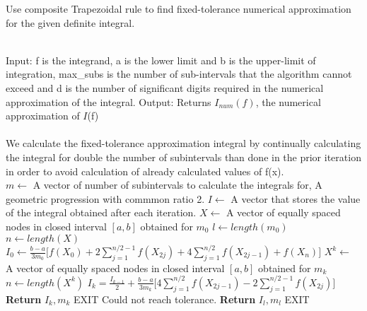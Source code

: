 \documentclass[12pt]{article}
\begin{document}
\begin{algorithm}[H]
	\caption{Use composite Trapezoidal rule to find fixed-tolerance numerical approximation for the given definite integral.}
	\begin{algorithmic}
		\hline \\
		\State Input: f is the integrand, a is the lower limit and b is the upper-limit of integration, max\_subs is the number of sub-intervals that the algorithm cannot exceed and d is the number of significant digits required in the numerical approximation of the integral.
		\State Output: Returns $I_{num}(f)$, the numerical approximation of $I$(f) 
		\\
		\hline 
		\\
		\Comment We calculate the fixed-tolerance approximation integral by continually calculating the integral for double the number of subintervals than done in the prior iteration in order to avoid calculation of already calculated values of f(x). \\
		\State $m \gets$ A vector of number of subintervals to calculate the integrals for, A geometric progression with commmon ratio 2.
		\State $I \gets $  A vector that stores the value of the integral obtained after each iteration.
		\State $X \gets $ A vector of equally spaced nodes in closed interval $[a,b]$ obtained for $m_0$
		\State $ l \gets length(m_0)$
		\State $ n \gets length(X)$
		\State $I_0 \gets {\displaystyle {\frac{b-a}{3m_0} }{\bigg [}f(X_{0})+2\sum _{j=1}^{n/2-1}f(X_{2j})+4\sum _{j=1}^{n/2}f(X_{2j-1})+f(X_{n}){\bigg ]}} $
		\State $X^k \gets $ A vector of equally spaced nodes in closed interval $[a,b]$ obtained for $m_k$
		\State $ n \gets length(X^k)$
		\State ${\displaystyle I_k = \frac{I_{k-1}}{2} + \frac{b-a}{3m_k}{\bigg [}4\sum _{j=1}^{n/2}f(X_{2j-1})-2\sum _{j=1}^{n/2-1}f(X_{2j}){\bigg ]}} $
		\State \textbf{Return} $I_k,m_k$
		\State EXIT
		\EndIf
		\EndFor    
		\State Could not reach tolerance.
		\State \textbf{Return} $I_l,m_l$
		\State EXIT
		\EndProcedure
	\end{algorithmic} 
\end{algorithm}
\end{document}
